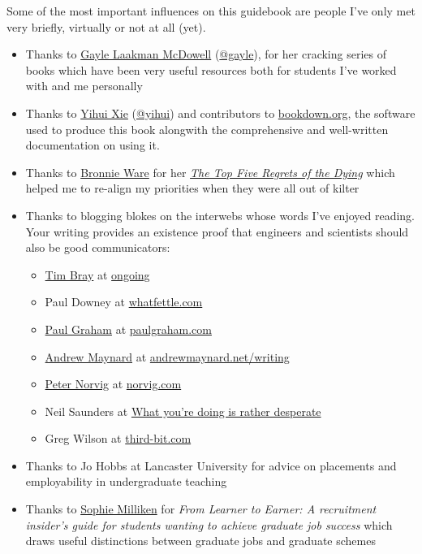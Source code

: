 \documentclass[
]{book}
\providecommand{\tightlist}{%
  \setlength{\itemsep}{0pt}\setlength{\parskip}{0pt}}
\begin{document}
Some of the most important influences on this guidebook are people I've only met very briefly, virtually or not at all (yet).

\begin{itemize}
\tightlist
\item
  Thanks to \href{https://en.wikipedia.org/wiki/Gayle_Laakmann_McDowell}{Gayle Laakman McDowell} (\href{https://twitter.com/gayle}{@gayle}), for her cracking series of books \citep{techcareer, cracking, crackingpm, crackingthepmcareer} which have been very useful resources both for students I've worked with and me personally
\item
  Thanks to \href{https://en.wikipedia.org/wiki/Yihui_Xie}{Yihui Xie} (\href{https://github.com/yihui}{@yihui}) and contributors to \href{https://bookdown.org}{bookdown.org}, the software used to produce this book alongwith the comprehensive and well-written documentation on using it. \citep{xie2017, xie2015, xie2020}
\item
  Thanks to \href{https://en.wikipedia.org/wiki/Bronnie_Ware}{Bronnie Ware} for her \emph{\href{https://en.wikipedia.org/wiki/The_Top_Five_Regrets_of_the_Dying}{The Top Five Regrets of the Dying}} \citep{regrets} which helped me to re-align my priorities when they were all out of kilter
\item
  Thanks to blogging blokes on the interwebs whose words I've enjoyed reading. Your writing provides an existence proof that engineers and scientists should also be good communicators:

  \begin{itemize}
  \tightlist
  \item
    \href{https://en.wikipedia.org/wiki/Tim_Bray}{Tim Bray} at \href{https://www.tbray.org/ongoing/}{ongoing}
  \item
    Paul Downey at \href{https://blog.whatfettle.com/}{whatfettle.com}
  \item
    \href{https://en.wikipedia.org/wiki/Paul_Graham_(programmer)}{Paul Graham} at \href{http://paulgraham.com/}{paulgraham.com}
  \item
    \href{https://en.wikipedia.org/wiki/Andrew_D._Maynard}{Andrew Maynard} at \href{https://andrewmaynard.net/writing/}{andrewmaynard.net/writing}
  \item
    \href{https://en.wikipedia.org/wiki/Peter_Norvig}{Peter Norvig} at \href{https://norvig.com/}{norvig.com}
  \item
    Neil Saunders at \href{https://nsaunders.wordpress.com/blog/}{What you're doing is rather desperate}
  \item
    Greg Wilson at \href{https://third-bit.com/}{third-bit.com}
  \end{itemize}
\item
  Thanks to Jo Hobbs at Lancaster University for advice on placements and employability in undergraduate teaching
\item
  Thanks to \href{https://twitter.com/SRS_Sophie}{Sophie Milliken} for \emph{From Learner to Earner: A recruitment insider's guide for students wanting to achieve graduate job success} \citep{milliken} which draws useful distinctions between graduate jobs and graduate schemes
\end{itemize}
\end{document}

